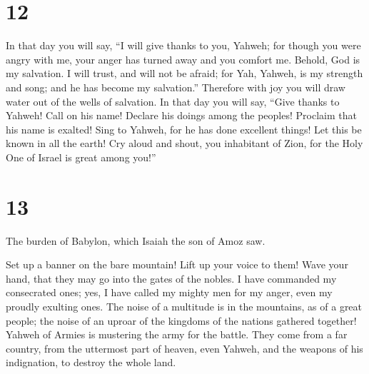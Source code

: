 \hypertarget{section-11}{%
\section{12}\label{section-11}}

 In that day you will say, ``I will give thanks to you,
Yahweh; for though you were angry with me, your anger has turned away
and you comfort me.  Behold, God is my salvation. I will
trust, and will not be afraid; for Yah, Yahweh, is my strength and song;
and he has become my salvation.''  Therefore with joy you
will draw water out of the wells of salvation.  In that
day you will say, ``Give thanks to Yahweh! Call on his name! Declare his
doings among the peoples! Proclaim that his name is exalted!
 Sing to Yahweh, for he has done excellent things! Let
this be known in all the earth!  Cry aloud and shout, you
inhabitant of Zion, for the Holy One of Israel is great among you!''

\hypertarget{section-12}{%
\section{13}\label{section-12}}

 The burden of Babylon, which Isaiah the son of Amoz saw.

 Set up a banner on the bare mountain! Lift up your voice
to them! Wave your hand, that they may go into the gates of the nobles.
 I have commanded my consecrated ones; yes, I have called
my mighty men for my anger, even my proudly exulting ones.
 The noise of a multitude is in the mountains, as of a
great people; the noise of an uproar of the kingdoms of the nations
gathered together! Yahweh of Armies is mustering the army for the
battle.  They come from a far country, from the uttermost
part of heaven, even Yahweh, and the weapons of his indignation, to
destroy the whole land.

